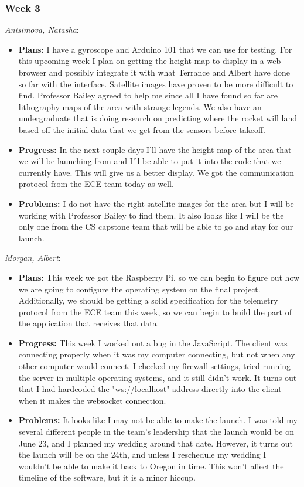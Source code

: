 \documentclass[10pt,draftclsnofoot,onecolumn]{IEEEtran}
\newcommand{\subsubsubsection}[1]{
	\hfill\break\textit{#1}:
}
\begin{document}
\subsubsection{Week 3}
\subsubsubsection{Anisimova, Natasha}
\begin{itemize}
	\item \textbf{Plans: }
	I have a gyroscope and Arduino 101 that we can use for testing. For this upcoming week I plan on getting the height map to display in a web browser and possibly integrate it with what Terrance and Albert have done so far with the interface. Satellite images have proven to be more difficult to find. Professor Bailey agreed to help me since all I have found so far are lithography maps of the area with strange legends. We also have an undergraduate that is doing research on predicting where the rocket will land based off the initial data that we get from the sensors before takeoff.
	\item \textbf{Progress: }
	In the next couple days I'll have the height map of the area that we will be launching from and I'll be able to put it into the code that we currently have. This will give us a better display. We got the communication protocol from the ECE team today as well.
	\item \textbf{Problems: }
	I do not have the right satellite images for the area but I will be working with Professor Bailey to find them. It also looks like I will be the only one from the CS capstone team that will be able to go and stay for our launch.
\end{itemize}
\subsubsubsection{Morgan, Albert}
\begin{itemize}
	\item \textbf{Plans: }
	This week we got the Raspberry Pi, so we can begin to figure out how we are going to configure the operating system on the final project. Additionally, we should be getting a solid specification for the telemetry protocol from the ECE team this week, so we can begin to build the part of the application that receives that data.
	\item \textbf{Progress: }
	This week I worked out a bug in the JavaScript. The client was connecting properly when it was my computer connecting, but not when any other computer would connect. I checked my firewall settings, tried running the server in multiple operating systems, and it still didn't work. It turns out that I had hardcoded the "ws://localhost" address directly into the client when it makes the websocket connection.
	\item \textbf{Problems: }
	It looks like I may not be able to make the launch. I was told my several different people in the team's leadership that the launch would be on June 23, and I planned my wedding around that date. However, it turns out the launch will be on the 24th, and unless I reschedule my wedding I wouldn't be able to make it back to Oregon in time. This won't affect the timeline of the software, but it is a minor hiccup.
\end{itemize}
\end{document}
